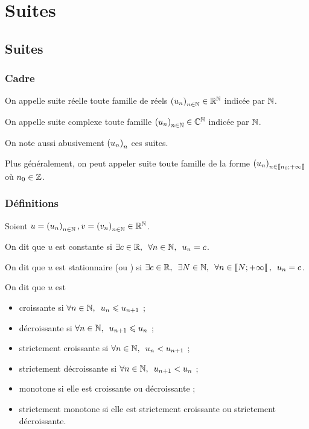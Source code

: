 \chapter{Suites}

\minitoc

\section{Suites}

\subsection{Cadre}

On appelle suite réelle toute famille de réels \(\left(u_n\right)_{n\in\mathbb{N}}\in\mathbb{R}^{\mathbb{N}}\) indicée par \(\mathbb{N}\).

On appelle suite complexe toute famille \(\left(u_n\right)_{n\in\mathbb{N}}\in\mathbb{C}^{\mathbb{N}}\) indicée par \(\mathbb{N}\).

On note aussi abusivement \(\left(u_n\right)_n\) ces suites.

Plus généralement, on peut appeler suite toute famille de la forme \(\left(u_n\right)_{n\in\left\llbracket n_0;+\infty\right\llbracket}\) où \(n_0\in\mathbb{Z}\).

\subsection{Définitions}

Soient \(u=\left(u_n\right)_{n\in\mathbb{N}},v=\left(v_n\right)_{n\in\mathbb{N}}\in\mathbb{R}^{\mathbb{N}}\).

On dit que \(u\) est constante si \(\quantifs{\exists c\in\R;\forall n\in\N}u_n=c\).

On dit que \(u\) est stationnaire (ou ) si \(\quantifs{\exists c\in\R;\exists N\in\N;\forall n\in\interventierie{N}{\pinf}}u_n=c\).

On dit que \(u\) est \begin{itemize}
\item croissante si \(\quantifs{\forall n\in\N}u_n\leq u_{n+1}\) ;

\item décroissante si \(\quantifs{\forall n\in\N}u_{n+1}\leq u_n\) ;

\item strictement croissante si \(\quantifs{\forall n\in\N}u_n<u_{n+1}\) ;

\item strictement décroissante si \(\quantifs{\forall n\in\N}u_{n+1}<u_n\) ;

\item monotone si elle est croissante ou décroissante ;

\item strictement monotone si elle est strictement croissante ou strictement décroissante.
\end{itemize}

